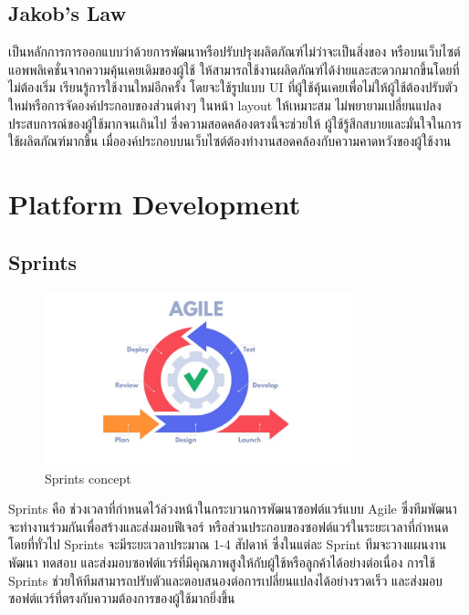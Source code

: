   \subsection{Jakob’s Law}
    \qquad เป็นหลักการการออกแบบว่าด้วยการพัฒนาหรือปรับปรุงผลิตภัณฑ์ไม่ว่าจะเป็นสิ่งของ หรือบนเว็บไซต์
    แอพพลิเคชั่นจากความคุ้นเคยเดิมของผู้ใช้ ให้สามารถใช้งานผลิตภัณฑ์ได้ง่ายและสะดวกมากขึ้นโดยที่ไม่ต้องเริ่ม
    เรียนรู้การใช้งานใหม่อีกครั้ง โดยจะใช้รูปแบบ UI ที่ผู้ใช้คุ้นเคยเพื่อไม่ให้ผู้ใช้ต้องปรับตัวใหม่หรือการจัดองค์ประกอบของส่วนต่างๆ
    ในหน้า layout ให้เหมาะสม ไม่พยายามเปลี่ยนแปลงประสบการณ์ของผู้ใช้มากจนเกินไป ซึ่งความสอดคล้องตรงนี้จะช่วยให้
    ผู้ใช้รู้สึกสบายและมั่นใจในการใช้ผลิตภัณฑ์มากขึ้น เมื่อองค์ประกอบบนเว็บไซต์ต้องทํางานสอดคล้องกับความคาดหวังของผู้ใช้งาน \cite{Jakob}

\section{Platform Development}
  \subsection{Sprints}
    \begin{figure}[!ht]
      \centering
      \includegraphics[width=0.8\textwidth]{image/Background/Sprints.jpg}
      \caption[Sprints]{Sprints concept}
      \label{fig:sprints_pic}
    \end{figure}
    \FloatBarrier
    \qquad Sprints คือ ช่วงเวลาที่กำหนดไว้ล่วงหน้าในกระบวนการพัฒนาซอฟต์แวร์แบบ Agile
    ซึ่งทีมพัฒนาจะทำงานร่วมกันเพื่อสร้างและส่งมอบฟีเจอร์ หรือส่วนประกอบของซอฟต์แวร์ในระยะเวลาที่กำหนด
    โดยที่ทั่วไป Sprints จะมีระยะเวลาประมาณ 1-4 สัปดาห์ ซึ่งในแต่ละ Sprint ทีมจะวางแผนงาน
    พัฒนา ทดสอบ และส่งมอบซอฟต์แวร์ที่มีคุณภาพสูงให้กับผู้ใช้หรือลูกค้าได้อย่างต่อเนื่อง
    การใช้ Sprints ช่วยให้ทีมสามารถปรับตัวและตอบสนองต่อการเปลี่ยนแปลงได้อย่างรวดเร็ว
    และส่งมอบซอฟต์แวร์ที่ตรงกับความต้องการของผู้ใช้มากยิ่งขึ้น \cite{Sprint}
